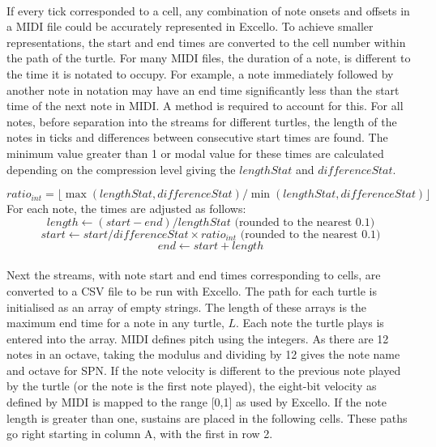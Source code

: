 \paragraph{} If every tick corresponded to a cell, any combination of note onsets and offsets in a MIDI file could be accurately represented in Excello. To achieve smaller representations, the start and end times are converted to the cell number within the path of the turtle. For many MIDI files, the duration of a note, is different to the time it is notated to occupy. For example, a note immediately followed by another note in notation may have an end time significantly less than the start time of the next note in MIDI. A method is required to account for this. For all notes, before separation into the streams for different turtles, the length of the notes in ticks and differences between consecutive start times are found. The minimum value greater than 1 or modal value for these times are calculated depending on the compression level giving the $lengthStat$ and $differenceStat$.

  $$ratio_{int} = \lfloor\max(lengthStat, differenceStat)/\min(lengthStat, differenceStat)\rfloor$$
For each note, the times are adjusted as follows:
  $$length \gets (start - end) / lengthStat \text{ (rounded to the nearest 0.1)}$$
  $$start \gets start / differenceStat \times ratio_{int} \text{ (rounded to the nearest 0.1)}$$
  $$end \gets start +length$$

\paragraph{} Next the streams, with note start and end times corresponding to cells, are converted to a CSV file to be run with Excello. The path for each turtle is initialised as an array of empty strings. The length of these arrays is the maximum end time for a note in any turtle, $L$.  Each note the turtle plays is entered into the array. MIDI defines pitch using the integers. As there are 12 notes in an octave, taking the modulus and dividing by 12 gives the note name and octave for SPN. If the note velocity is different to the previous note played by the turtle (or the note is the first note played), the eight-bit velocity as defined by MIDI is mapped to the range [0,1] as used by Excello. If the note length is greater than one, sustains are placed in the following cells. These paths go right starting in column A, with the first in row 2.


